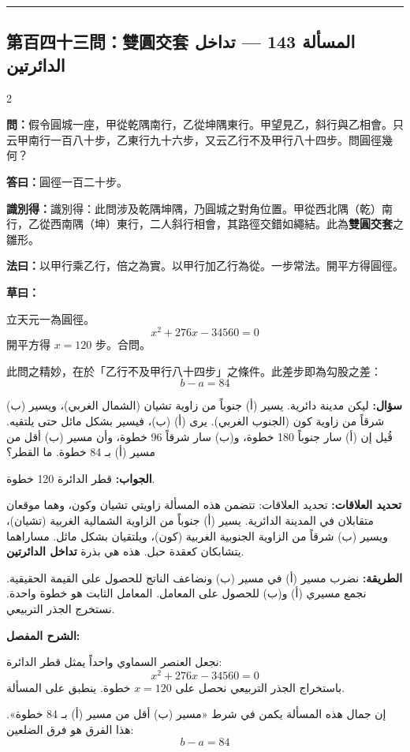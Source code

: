 \documentclass[11pt,a4paper]{article}
\newcommand{\ar}[1]{\arabicfont\beginR #1\endR}
\newcommand{\arb}[1]{\textbf{\arabicfont\beginR #1\endR}}
\newcommand{\longline}{\noindent\rule{\textwidth}{0.4pt}}
\newcommand{\arnote}[1]{\textcolor{arabicblue}{\ar{#1}}}
\newcommand{\wen}[1]{\par\noindent\textbf{\textcolor{probcolor}{問：}}{#1}\par}
\newcommand{\da}[1]{\par\noindent\textbf{\textcolor{anscolor}{答曰：}}{#1}\par}
\newcommand{\fayue}[1]{\par\noindent\textbf{\textcolor{methodcolor}{法曰：}}{#1}\par}
\newcommand{\caoyue}[1]{\par\noindent\textbf{草曰：}{#1}\par}
\newcommand{\zhi}[1]{\par\noindent\textbf{識別得：}{#1}\par}
\newcommand{\arwen}[1]{\par\noindent\arb{سؤال: }\arnote{#1}\par}
\newcommand{\arjwb}[1]{\par\noindent\arb{الجواب: }\arnote{#1}\par}
\newcommand{\arqwd}[1]{\par\noindent\arb{الطريقة: }\arnote{#1}\par}
\newcommand{\arshr}[1]{\par\noindent\arb{الشرح المفصل: }\arnote{#1}\par}
\newcommand{\arfl}[1]{\par\noindent\arb{تحديد العلاقات: }\arnote{#1}\par}
\begin{document}
\vspace{0.3cm}
\longline

\subsection*{第百四十三問：雙圓交套 \hfill \ar{المسألة 143 — تداخل الدائرتين}}

\begin{paracol}{2}

\begin{leftcolumn}
\wen{假令圓城一座，甲從乾隅南行，乙從坤隅東行。甲望見乙，斜行與乙相會。只云甲南行一百八十步，乙東行九十六步，又云乙行不及甲行八十四步。問圓徑幾何？}

\da{圓徑一百二十步。}

\zhi{識別得：此問涉及乾隅坤隅，乃圓城之對角位置。甲從西北隅（乾）南行，乙從西南隅（坤）東行，二人斜行相會，其路徑交錯如繩結。此為\textbf{雙圓交套}之雛形。}

\fayue{以甲行乘乙行，倍之為實。以甲行加乙行為從。一步常法。開平方得圓徑。}

\caoyue{
立天元一為圓徑。
$$x^2 + 276x - 34560 = 0$$
開平方得 $x = 120$ 步。合問。

此問之精妙，在於「乙行不及甲行八十四步」之條件。此差步即為勾股之差：
$$b - a = 84$$
}
\end{leftcolumn}

\begin{rightcolumn}
\arwen{ليكن مدينة دائرية. يسير (أ) جنوباً من زاوية تشيان (الشمال الغربي)، ويسير (ب) شرقاً من زاوية كون (الجنوب الغربي). يرى (أ) (ب)، فيسير بشكل مائل حتى يلتقيه. قُيل إن (أ) سار جنوباً 180 خطوة، و(ب) سار شرقاً 96 خطوة، وأن مسير (ب) أقل من مسير (أ) بـ 84 خطوة. ما القطر؟}

\arjwb{قطر الدائرة 120 خطوة.}

\arfl{تحديد العلاقات: تتضمن هذه المسألة زاويتي تشيان وكون، وهما موقعان متقابلان في المدينة الدائرية. يسير (أ) جنوباً من الزاوية الشمالية الغربية (تشيان)، ويسير (ب) شرقاً من الزاوية الجنوبية الغربية (كون)، ويلتقيان بشكل مائل. مساراهما يتشابكان كعقدة حبل. هذه هي بذرة \textbf{تداخل الدائرتين}.}

\arqwd{نضرب مسير (أ) في مسير (ب) ونضاعف الناتج للحصول على القيمة الحقيقية. نجمع مسيري (أ) و(ب) للحصول على المعامل. المعامل الثابت هو خطوة واحدة. نستخرج الجذر التربيعي.}

\arshr{نجعل العنصر السماوي واحداً يمثل قطر الدائرة:
$$x^2 + 276x - 34560 = 0$$
باستخراج الجذر التربيعي نحصل على $x = 120$ خطوة. ينطبق على المسألة.

إن جمال هذه المسألة يكمن في شرط «مسير (ب) أقل من مسير (أ) بـ 84 خطوة». هذا الفرق هو فرق الضلعين:
$$b - a = 84$$}
\end{rightcolumn}

\end{paracol}
\end{document}
